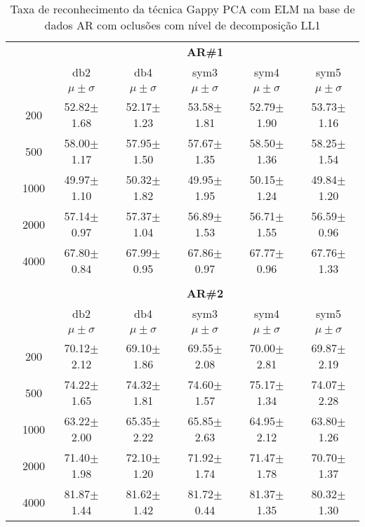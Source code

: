 \begin{table}[H]
	\centering
    \normalsize
	\caption{Taxa de reconhecimento da técnica Gappy PCA com ELM na base de dados AR com oclusões com nível de decomposição LL1}
	\begin{tabular}{|c|c|c c c c c|}
\cline{3-7}
\multicolumn{2}{c|}{\multirow{3}{*}{}} & \multicolumn{5}{c|}{\textbf{AR\#1}}   \\\cline{3-7} 
\multicolumn{2}{c|}{}  & db2 & db4 & sym3 & sym4 & sym5 \\\cline{3-7}%
\multicolumn{2}{c|}{}& $\mu \pm \sigma$ & $\mu \pm \sigma$ & $\mu \pm \sigma$ & $\mu \pm \sigma$ & $\mu \pm \sigma$ \\\hline


\multicolumn{1}{|c|}{ \multirow{5}{*}{\rotatebox[origin=c]{90}{\textbf{Neurônios}}} }
&200	&52.82$\pm$1.68	&52.17$\pm$1.23	&53.58$\pm$1.81	&52.79$\pm$1.90	&53.73$\pm$1.16\\\cline{2-7}
&500	&58.00$\pm$1.17	&57.95$\pm$1.50	&57.67$\pm$1.35	&58.50$\pm$1.36	&58.25$\pm$1.54\\\cline{2-7}
&1000	&49.97$\pm$1.10	&50.32$\pm$1.82	&49.95$\pm$1.95	&50.15$\pm$1.24	&49.84$\pm$1.20\\\cline{2-7}
&2000	&57.14$\pm$0.97	&57.37$\pm$1.04	&56.89$\pm$1.53	&56.71$\pm$1.55	&56.59$\pm$0.96\\\cline{2-7}
&4000	&67.80$\pm$0.84	&67.99$\pm$0.95	&67.86$\pm$0.97	&67.77$\pm$0.96	&67.76$\pm$1.33




\\\midrule%

\multicolumn{7}{c}{}\\ 

\cline{3-7}
\multicolumn{2}{c|}{\multirow{3}{*}{}} & \multicolumn{5}{c|}{\textbf{AR\#2}}   \\\cline{3-7} 

\multicolumn{2}{c|}{}  & db2 & db4 & sym3 & sym4 & sym5 \\\cline{3-7}
\multicolumn{2}{c|}{}& $\mu \pm \sigma$ & $\mu \pm \sigma$ & $\mu \pm \sigma$ & $\mu \pm \sigma$ & $\mu \pm \sigma$ \\\hline


\multicolumn{1}{|c|}{ \multirow{5}{*}{\rotatebox[origin=c]{90}{\textbf{Neurônios}}} }
&200	&70.12$\pm$2.12	&69.10$\pm$1.86	&69.55$\pm$2.08	&70.00$\pm$2.81	&69.87$\pm$2.19\\\cline{2-7}
&500	&74.22$\pm$1.65	&74.32$\pm$1.81	&74.60$\pm$1.57	&75.17$\pm$1.34	&74.07$\pm$2.28\\\cline{2-7}
&1000	&63.22$\pm$2.00	&65.35$\pm$2.22	&65.85$\pm$2.63	&64.95$\pm$2.12	&63.80$\pm$1.26\\\cline{2-7}
&2000	&71.40$\pm$1.98	&72.10$\pm$1.20	&71.92$\pm$1.74	&71.47$\pm$1.78	&70.70$\pm$1.37\\\cline{2-7}
&4000	&81.87$\pm$1.44	&81.62$\pm$1.42	&81.72$\pm$0.44	&81.37$\pm$1.35	&80.32$\pm$1.30



\end{tabular}
\end{table}
